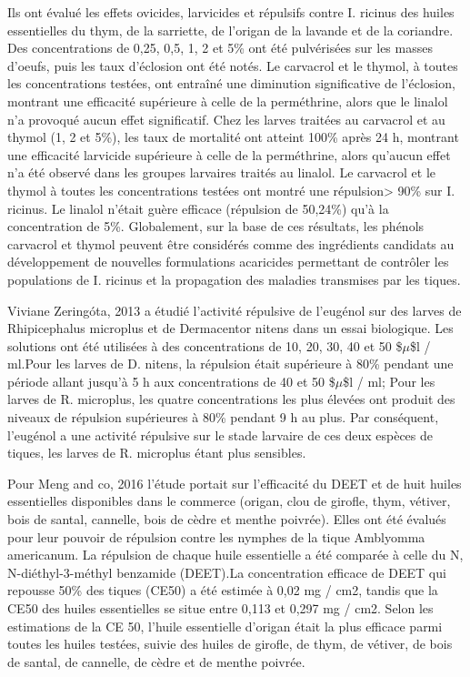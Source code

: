 \documentclass[12pt,a4wide]{article}
\begin{document}
Ils ont  évalué les effets ovicides,  larvicides et répulsifs contre  I. ricinus
des huiles essentielles du  thym, de la sarriette, de l'origan  de la lavande et
de  la  coriandre.   Des concentrations  de  0,25,  0,5,  1,  2 et  5\%  ont  été
pulvérisées sur les  masses d'oeufs, puis les taux d'éclosion  ont été notés. Le
carvacrol et  le thymol, à toutes  les concentrations testées, ont  entraîné une
diminution  significative de  l'éclosion, montrant  une efficacité  supérieure à
celle  de  la  perméthrine,  alors  que le  linalol  n'a  provoqué  aucun  effet
significatif. Chez les larves  traitées au carvacrol et au thymol  (1, 2 et 5\%),
les  taux de  mortalité ont  atteint 100\%  après 24  h, montrant  une efficacité
larvicide supérieure  à celle de  la perméthrine,  alors qu'aucun effet  n'a été
observé dans les groupes larvaires traités au linalol. Le carvacrol et le thymol
à  toutes  les  concentrations  testées   ont  montré  une  répulsion>  90\%  sur
I. ricinus.  Le linalol  n’était guère  efficace (répulsion  de 50,24\%)  qu’à la
concentration de  5\%. Globalement,  sur la  base de  ces résultats,  les phénols
carvacrol et thymol  peuvent être considérés comme des  ingrédients candidats au
développement de  nouvelles formulations acaricides permettant  de contrôler les
populations de  I. ricinus  et la  propagation des  maladies transmises  par les
tiques.


Viviane  Zeringóta, 2013  a étudié  l'activité  répulsive de  l'eugénol sur  des
larves  de  Rhipicephalus microplus  et  de  Dermacentor  nitens dans  un  essai
biologique. Les solutions ont été utilisées  à des concentrations de 10, 20, 30,
40 et 50 \$$\mu$\$l / ml.Pour les larves de D. nitens, la répulsion était supérieure
à 80\%  pendant une période  allant jusqu’à  5 h aux  concentrations de 40  et 50
\$$\mu$\$l /  ml; Pour les  larves de R.   microplus, les quatre  concentrations les
plus élevées ont produit des niveaux de  répulsion supérieures à 80\% pendant 9 h
au  plus. Par  conséquent,  l'eugénol  a une  activité  répulsive  sur le  stade
larvaire de ces  deux espèces de tiques,  les larves de R.  microplus étant plus
sensibles.



Pour Meng  and co,  2016 l'étude  portait sur  l'efficacité du  DEET et  de huit
huiles essentielles disponibles dans le commerce (origan, clou de girofle, thym,
vétiver, bois de  santal, cannelle, bois de cèdre et  menthe poivrée). Elles ont
été  évalués pour  leur pouvoir  de  répulsion contre  les nymphes  de la  tique
Amblyomma americanum. La répulsion de chaque  huile essentielle a été comparée à
celle  du N,  N-diéthyl-3-méthyl benzamide  (DEET).La concentration  efficace de
DEET qui repousse  50\% des tiques (CE50) a  été estimée à 0,02 mg  / cm2, tandis
que  la  CE50 des  huiles  essentielles  se situe  entre  0,113  et 0,297  mg  /
cm2. Selon  les estimations de la  CE 50, l'huile essentielle  d'origan était la
plus efficace parmi toutes les huiles  testées, suivie des huiles de girofle, de
thym, de vétiver, de bois de santal, de cannelle, de cèdre et de menthe poivrée.
\end{document}
